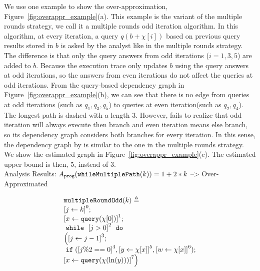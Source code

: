 \begin{example}
We use one example to show the over-approximation, Figure~\ref{fig:overappr_example}(a). This example is the variant of the multiple rounds strategy, 
we call it a multiple rounds odd iteration algorithm. In this algorithm, at every iteration, a query $q(b+\chi[i])$ based on previous query results stored in $b$ is asked by the analyst like in the multiple rounds strategy. The difference is that only the query answers from odd iterations ($i =1,3, 5$) are added to $b$. 
  Because the execution trace only updates $b$ using the query answers at odd iterations, so the answers from even iterations do not affect the queries at odd iterations. From the query-based dependency graph in Figure~\ref{fig:overappr_example}(b), we can see that there is no edge from queries at odd iterations (such as $q_1,q_3,q_5$) to queries at even iteration(such as $q_2,q_4$). The longest path is dashed with a length $3$.  However, {\THESYSTEM} fails to realize that odd iteration will always execute then branch and even iteration means else branch, so its dependency graph considers both branches for every iteration. In this sense, the dependency graph by {\THESYSTEM} is similar to the one in the multiple rounds strategy. We show the estimated graph in Figure~\ref{fig:overappr_example}(c). The estimated upper bound is then, $5$, instead of $3$. 
%
\\
Analysis Results: $ A_{\mathtt{prog}}(\mathtt{whileMultiplePath}(k)) = 1 + 2 * k $ --> Over-Approximated
%
{ \small
\begin{figure}
\centering
    \begin{subfigure}{0.3\textwidth}
\centering
\[
    \begin{array}{l}
        \kw{multipleRoundOdd}(k) \triangleq \\
        \clabel{ \assign{j}{k}}^{0} ; \\
        \clabel{ \assign{x}{\query(\chi[0])} }^{1} ; \\
            \ewhile ~ \clabel{j > 0}^{2} ~ \edo ~ \\
            \Big(
             \clabel{\assign{j}{j-1}}^{3} ;\\
             \eif(\clabel{j \% 2 == 0}^{4}, 
             \clabel{\assign{y}{\chi[x]}}^{5}, 
             \clabel{\assign{w}{\chi[x]}}^{6});\\                            
             \clabel{\assign{x}{\query(\chi(\ln(y)))} }^{7} \Big)
        \end{array}
    \]
 \caption{}
    \end{subfigure}
%
\begin{subfigure}{.3\textwidth}

\end{subfigure}
\end{figure}}
\end{example}
